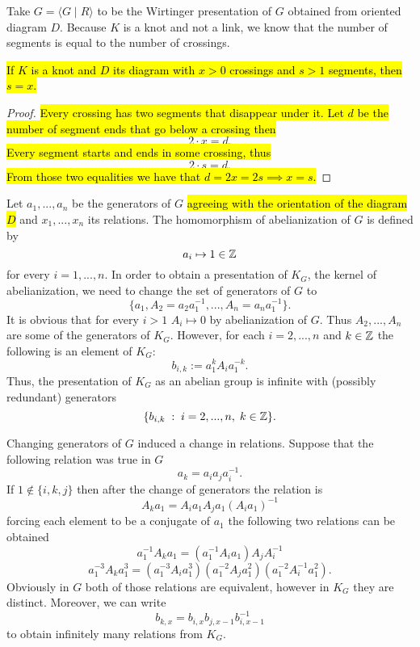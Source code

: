 Take $G=\langle G\;|\;R\rangle$ to be the Wirtinger presentation of $G$ obtained from oriented diagram $D$. Because $K$ is a knot and not a link, we know that the number of segments is equal to the number of crossings.

\begin{lemma}\label{ilosc segmentow to ilosc skrzyzowan}\hl{
  If $K$ is a knot and $D$ its diagram with $x>0$ crossings and $s>1$ segments, then $s=x$.}
\end{lemma}

\begin{proof}\hl{
  Every crossing has two segments that disappear under it. Let $d$ be the number of segment ends that go below a crossing then}
  $$2\cdot x=d.$$ \hl{
  Every segment starts and ends in some crossing, thus}
  $$2\cdot s=d.$$\hl{
  From those two equalities we have that $d=2x=2s\implies x=s$.}
\end{proof}

Let $a_1,...,a_n$ be the generators of $G$ \hl{agreeing with the orientation of the diagram $D$} and $x_1,...,x_n$ its relations. The homomorphism of abelianization of $G$ is defined by 
$$a_i\mapsto 1\in\operatorname{\mathbb{Z}}$$ 
for every $i=1,...,n$. In order to obtain a presentation of $K_G$, the kernel of abelianization, we need to change the set of generators of $G$ to 
$$\{a_1, A_2=a_2a_1^{-1},..., A_n=a_na_1^{-1}\}.$$
It is obvious that for every $i>1$ $A_i\mapsto0$ by abelianization of $G$. Thus $A_2,...,A_n$ are some of the generators of $K_G$. However, for each $i=2,...,n$ and $k\in\operatorname{\mathbb{Z}}$ the following is an element of $K_G$:
$$b_{i, k}:=a_1^k A_i a_1^{-k}.$$
Thus, the presentation of $K_G$ as an abelian group is infinite with (possibly redundant) generators 
$$\{b_{i,k}\;:\;i=2,...,n,\;k\in\operatorname{\mathbb{Z}}\}.$$

Changing generators of $G$ induced a change in relations. Suppose that the following relation was true in $G$
$$a_k=a_ia_ja_i^{-1}.$$
If $1\notin\{i,k,j\}$ then after the change of generators the relation is
$$ A_ka_1 = A_ia_1 A_ja_1 (A_ia_1)^{-1}
$$
forcing each element to be a conjugate of $a_1$ the following two relations can be obtained
$$ a_1^{-1}A_ka_1=(a_1^{-1} A_i a_1)A_jA_i^{-1}
$$
$$
a_1^{-3} A_k a_1^3 = (a_1^{-3} A_i a_1^3) (a_1^{-2} A_j a_1^2) (a_1^{-2} A_i^{-1} a_1^2).
$$
Obviously in $G$ both of those relations are equivalent, however in $K_G$ they are distinct. Moreover, we can write 
$$
b_{k, x}=b_{i, x}b_{j, x-1}b_{i, x-1}^{-1}
$$
to obtain infinitely many relations from $K_G$.

